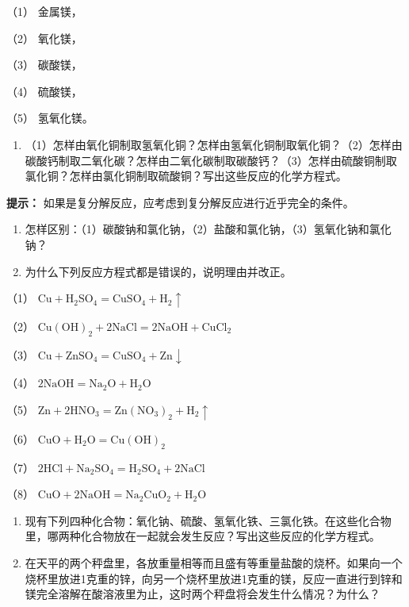 （1） 金属镁，

（2） 氧化镁，

（3） 碳酸镁，

（4） 硫酸镁，

（5） 氢氧化镁。

\begin{enumerate}[start=4]
\item
  （1）怎样由氧化铜制取氢氧化铜？怎样由氢氧化铜制取氧化铜？（2）怎样由碳酸钙制取二氧化碳？怎样由二氧化碳制取碳酸钙？（3）怎样由硫酸铜制取氯化铜？怎样由氯化铜制取硫酸铜？写出这些反应的化学方程式。
\end{enumerate}

\begin{shulihuadef}
\textbf{提示：} 如果是复分解反应，应考虑到复分解反应进行近乎完全的条件。
\end{shulihuadef}

\begin{enumerate}[start=5]
\item
  怎样区别：（1）碳酸钠和氯化钠，（2）盐酸和氯化钠，（3）氢氧化钠和氯化钠？
\item
  为什么下列反应方程式都是错误的，说明理由并改正。
\end{enumerate}

（1）
\(\mathrm{Cu} + \mathrm{H}_2\mathrm{SO}_4 = \mathrm{CuSO}_4 + \mathrm{H}_2\uparrow\)

（2）
\(\mathrm{Cu(OH)}_2 + 2\mathrm{NaCl} = 2\mathrm{NaOH} + \mathrm{CuCl}_2\)

（3）
\(\mathrm{Cu} + \mathrm{ZnSO}_4 = \mathrm{CuSO}_4 + \mathrm{Zn}\downarrow\)

（4）
\(2\mathrm{NaOH} = \mathrm{Na}_{2}\mathrm{O} + \mathrm{H}_{2}\mathrm{O}\)

（5）
\(\mathrm{Zn} + 2\mathrm{HNO}_3 = \mathrm{Zn(NO_3)_2 + H_2\uparrow}\)

（6） \(\mathrm{CuO + H_2O = Cu(OH)_2}\)

（7）
\(2\mathrm{HCl} + \mathrm{Na}_{2}\mathrm{SO}_{4} = \mathrm{H}_{2}\mathrm{SO}_{4} + 2\mathrm{NaCl}\)

（8） \(\mathrm{CuO + 2NaOH = Na_2CuO_2 + H_2O}\)

\begin{enumerate}[start=7]
\item
  现有下列四种化合物：氧化钠、硫酸、氢氧化铁、三氯化铁。在这些化合物里，哪两种化合物放在一起就会发生反应？写出这些反应的化学方程式。
\item
  在天平的两个秤盘里，各放重量相等而且盛有等重量盐酸的烧杯。如果向一个烧杯里放进1克重的锌，向另一个烧杯里放进1克重的镁，反应一直进行到锌和镁完全溶解在酸溶液里为止，这时两个秤盘将会发生什么情况？为什么？
\end{enumerate}

